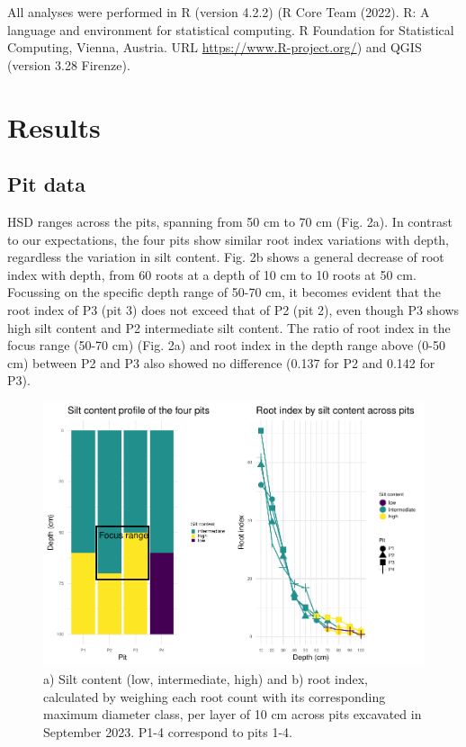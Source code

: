 \documentclass[fleqn,11pt]{latex/stylish_article} %
\begin{document}
All analyses were performed in R (version 4.2.2) (R Core Team (2022). R: A language and environment for statistical computing. R Foundation for Statistical Computing, Vienna, Austria. URL \url{https://www.R-project.org/}) and QGIS (version 3.28 Firenze).

\hypertarget{results}{%
\section{Results}\label{results}}

\hypertarget{pit-data}{%
\subsection{Pit data}\label{pit-data}}

HSD ranges across the pits, spanning from 50 cm to 70 cm (Fig. 2a). In contrast to our expectations, the four pits show similar root index variations with depth, regardless the variation in silt content. Fig. 2b shows a general decrease of root index with depth, from 60 roots at a depth of 10 cm to 10 roots at 50 cm. Focussing on the specific depth range of 50-70 cm, it becomes evident that the root index of P3 (pit 3) does not exceed that of P2 (pit 2), even though P3 shows high silt content and P2 intermediate silt content. The ratio of root index in the focus range (50-70 cm) (Fig. 2a) and root index in the depth range above (0-50 cm) between P2 and P3 also showed no difference (0.137 for P2 and 0.142 for P3).



\scriptsize

\begin{figure}

{\centering \includegraphics[width=0.8\linewidth,]{pedoP16-report_files/figure-latex/pit-1} 

}

\caption{a) Silt content (low, intermediate, high) and b) root index, calculated by weighing each root count with its corresponding maximum diameter class, per layer of 10 cm across pits excavated in September 2023. P1-4 correspond to pits 1-4.}\label{fig:pit}
\end{figure}
\end{document}
